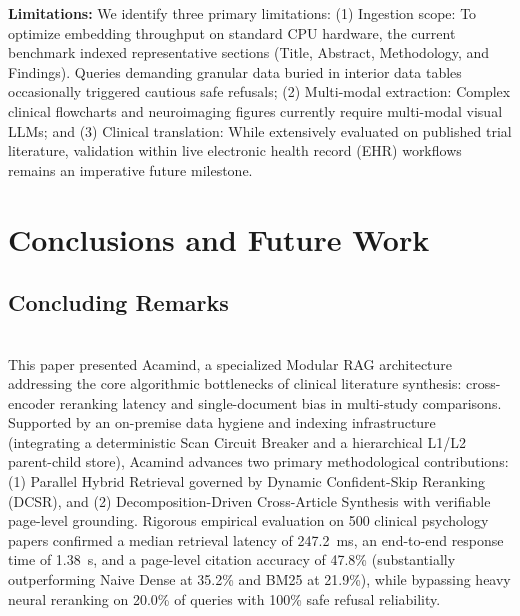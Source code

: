 \documentclass[10pt]{SPIIRAS_Proceedings}
\begin{document}
\textbf{Limitations:} We identify three primary limitations: (1) Ingestion scope: To optimize embedding throughput on standard CPU hardware, the current benchmark indexed representative sections (Title, Abstract, Methodology, and Findings). Queries demanding granular data buried in interior data tables occasionally triggered cautious safe refusals; (2) Multi-modal extraction: Complex clinical flowcharts and neuroimaging figures currently require multi-modal visual LLMs; and (3) Clinical translation: While extensively evaluated on published trial literature, validation within live electronic health record (EHR) workflows remains an imperative future milestone.

\section{Conclusions and Future Work}

\subsection{Concluding Remarks}~\\
\hspace*{\parindent}This paper presented Acamind, a specialized Modular RAG architecture addressing the core algorithmic bottlenecks of clinical literature synthesis: cross-encoder reranking latency and single-document bias in multi-study comparisons. Supported by an on-premise data hygiene and indexing infrastructure (integrating a deterministic Scan Circuit Breaker and a hierarchical L1/L2 parent-child store), Acamind advances two primary methodological contributions: (1) Parallel Hybrid Retrieval governed by Dynamic Confident-Skip Reranking (DCSR), and (2) Decomposition-Driven Cross-Article Synthesis with verifiable page-level grounding. Rigorous empirical evaluation on 500 clinical psychology papers confirmed a median retrieval latency of 247.2~ms, an end-to-end response time of 1.38~s, and a page-level citation accuracy of 47.8\% (substantially outperforming Naive Dense at 35.2\% and BM25 at 21.9\%), while bypassing heavy neural reranking on 20.0\% of queries with 100\% safe refusal reliability.
\end{document}
